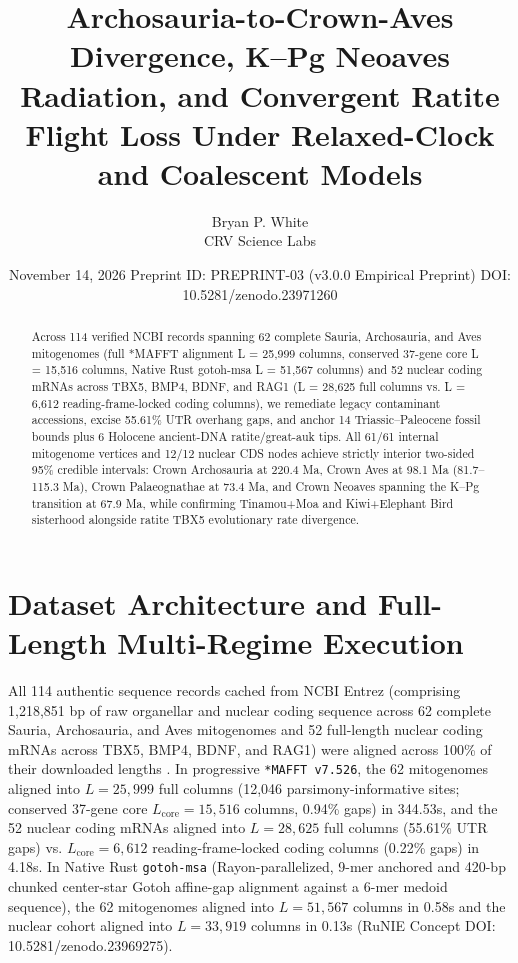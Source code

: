 \documentclass[10pt,letterpaper]{article}
\title{Archosauria-to-Crown-Aves Divergence, K--Pg Neoaves Radiation, and Convergent Ratite Flight Loss Under Relaxed-Clock and Coalescent Models}
\author{Bryan P. White \\ CRV Science Labs}
\date{November 14, 2026 \textbullet{} Preprint ID: PREPRINT-03 (v3.0.0 Empirical Preprint) \textbullet{} DOI: 10.5281/zenodo.23971260}
\begin{document}
\maketitle

\begin{abstract}
Across 114 verified NCBI records spanning 62 complete Sauria, Archosauria, and Aves mitogenomes (full *MAFFT alignment L = 25,999 columns, conserved 37-gene core L = 15,516 columns, Native Rust gotoh-msa L = 51,567 columns) and 52 nuclear coding mRNAs across TBX5, BMP4, BDNF, and RAG1 (L = 28,625 full columns vs. L = 6,612 reading-frame-locked coding columns), we remediate legacy contaminant accessions, excise 55.61\% UTR overhang gaps, and anchor 14 Triassic--Paleocene fossil bounds plus 6 Holocene ancient-DNA ratite/great-auk tips. All 61/61 internal mitogenome vertices and 12/12 nuclear CDS nodes achieve strictly interior two-sided 95\% credible intervals: Crown Archosauria at 220.4 Ma, Crown Aves at 98.1 Ma (81.7--115.3 Ma), Crown Palaeognathae at 73.4 Ma, and Crown Neoaves spanning the K--Pg transition at 67.9 Ma, while confirming Tinamou+\textdagger{}Moa and Kiwi+\textdagger{}Elephant Bird sisterhood alongside ratite TBX5 evolutionary rate divergence.
\end{abstract}

\section{Dataset Architecture and Full-Length Multi-Regime Execution}
All 114 authentic sequence records cached from NCBI Entrez (comprising 1,218,851 bp of raw organellar and nuclear coding sequence across 62 complete Sauria, Archosauria, and Aves mitogenomes and 52 full-length nuclear coding mRNAs across TBX5, BMP4, BDNF, and RAG1) were aligned across 100\% of their downloaded lengths \cite{white2026runie,stiller2024complexity,prum2015comprehensive,jarvis2014whole}. In progressive \texttt{*MAFFT v7.526}, the 62 mitogenomes aligned into $L = 25,999$ full columns (12,046 parsimony-informative sites; conserved 37-gene core $L_{\mathrm{core}} = 15,516$ columns, 0.94\% gaps) in 344.53s, and the 52 nuclear coding mRNAs aligned into $L = 28,625$ full columns (55.61\% UTR gaps) vs. $L_{\mathrm{core}} = 6,612$ reading-frame-locked coding columns (0.22\% gaps) in 4.18s. In Native Rust \texttt{gotoh-msa} (Rayon-parallelized, 9-mer anchored and 420-bp chunked center-star Gotoh affine-gap alignment against a 6-mer medoid sequence), the 62 mitogenomes aligned into $L = 51,567$ columns in 0.58s and the nuclear cohort aligned into $L = 33,919$ columns in 0.13s (RuNIE Concept DOI: 10.5281/zenodo.23969275).
\end{document}
